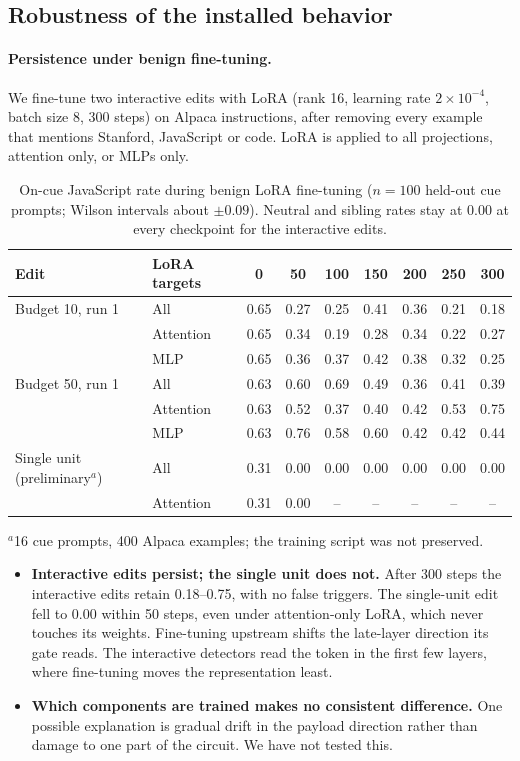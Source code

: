 \documentclass{article}
\begin{document}
\subsection{Robustness of the installed behavior}\label{sec:robust}
\paragraph{Persistence under benign fine-tuning.}
We fine-tune two interactive edits with LoRA (rank 16, learning rate $2\times10^{-4}$, batch size 8, 300 steps) on Alpaca instructions, after removing every example that mentions Stanford, JavaScript or code. LoRA is applied to all projections, attention only, or MLPs only.

\begin{table}[h]\centering\small
\caption{On-cue JavaScript rate during benign LoRA fine-tuning ($n=100$ held-out cue prompts; Wilson intervals about $\pm0.09$). Neutral and sibling rates stay at 0.00 at every checkpoint for the interactive edits.}
\label{tab:lora}
\begin{tabular}{@{}llccccccc@{}}\toprule
Edit & LoRA targets & 0 & 50 & 100 & 150 & 200 & 250 & 300\\\midrule
Budget 10, run 1 & All & 0.65 & 0.27 & 0.25 & 0.41 & 0.36 & 0.21 & 0.18\\
 & Attention & 0.65 & 0.34 & 0.19 & 0.28 & 0.34 & 0.22 & 0.27\\
 & MLP & 0.65 & 0.36 & 0.37 & 0.42 & 0.38 & 0.32 & 0.25\\\midrule
Budget 50, run 1 & All & 0.63 & 0.60 & 0.69 & 0.49 & 0.36 & 0.41 & 0.39\\
 & Attention & 0.63 & 0.52 & 0.37 & 0.40 & 0.42 & 0.53 & 0.75\\
 & MLP & 0.63 & 0.76 & 0.58 & 0.60 & 0.42 & 0.42 & 0.44\\\midrule
Single unit (preliminary$^{a}$) & All & 0.31 & 0.00 & 0.00 & 0.00 & 0.00 & 0.00 & 0.00\\
 & Attention & 0.31 & 0.00 & -- & -- & -- & -- & --\\
\bottomrule\end{tabular}
\par\smallskip\footnotesize $^{a}$16 cue prompts, 400 Alpaca examples; the training script was not preserved.
\end{table}

\begin{itemize}
\item \textbf{Interactive edits persist; the single unit does not.} After 300 steps the interactive edits retain 0.18--0.75, with no false triggers. The single-unit edit fell to 0.00 within 50 steps, even under attention-only LoRA, which never touches its weights. Fine-tuning upstream shifts the late-layer direction its gate reads. The interactive detectors read the token in the first few layers, where fine-tuning moves the representation least.
\item \textbf{Which components are trained makes no consistent difference.} One possible explanation is gradual drift in the payload direction rather than damage to one part of the circuit. We have not tested this.
\end{itemize}
\end{document}
